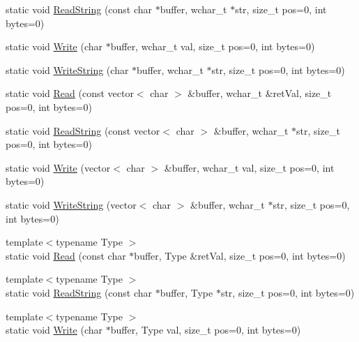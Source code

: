 \begin{DoxyCompactItemize}
\item 
static void \hyperlink{struct_y_compound_files_1_1_little_endian_a0d5fa769f24deb1c0d64b0d2166380b4}{Read\+String} (const char $\ast$buffer, wchar\+\_\+t $\ast$str, size\+\_\+t pos=0, int bytes=0)
\item 
static void \hyperlink{struct_y_compound_files_1_1_little_endian_a5ef0063196ca0fb704011bf7dda670cd}{Write} (char $\ast$buffer, wchar\+\_\+t val, size\+\_\+t pos=0, int bytes=0)
\item 
static void \hyperlink{struct_y_compound_files_1_1_little_endian_a8e1c4f95816e34b7b01acef853677354}{Write\+String} (char $\ast$buffer, wchar\+\_\+t $\ast$str, size\+\_\+t pos=0, int bytes=0)
\item 
static void \hyperlink{struct_y_compound_files_1_1_little_endian_a8a619b28efc8943270515b67c78c393d}{Read} (const vector$<$ char $>$ \&buffer, wchar\+\_\+t \&ret\+Val, size\+\_\+t pos=0, int bytes=0)
\item 
static void \hyperlink{struct_y_compound_files_1_1_little_endian_a7be32fbf63ebbf7eb40585c12e943571}{Read\+String} (const vector$<$ char $>$ \&buffer, wchar\+\_\+t $\ast$str, size\+\_\+t pos=0, int bytes=0)
\item 
static void \hyperlink{struct_y_compound_files_1_1_little_endian_af9c956dd7d659648601412f90eaa06a3}{Write} (vector$<$ char $>$ \&buffer, wchar\+\_\+t val, size\+\_\+t pos=0, int bytes=0)
\item 
static void \hyperlink{struct_y_compound_files_1_1_little_endian_a5d0a7504c887a43d1cf121b794e58645}{Write\+String} (vector$<$ char $>$ \&buffer, wchar\+\_\+t $\ast$str, size\+\_\+t pos=0, int bytes=0)
\item 
{\footnotesize template$<$typename Type $>$ }\\static void \hyperlink{struct_y_compound_files_1_1_little_endian_aa1abbafbc2ae88773a9de5fdedc2951d}{Read} (const char $\ast$buffer, Type \&ret\+Val, size\+\_\+t pos=0, int bytes=0)
\item 
{\footnotesize template$<$typename Type $>$ }\\static void \hyperlink{struct_y_compound_files_1_1_little_endian_a70f369d37063b9992e94775a44b1c6ec}{Read\+String} (const char $\ast$buffer, Type $\ast$str, size\+\_\+t pos=0, int bytes=0)
\item 
{\footnotesize template$<$typename Type $>$ }\\static void \hyperlink{struct_y_compound_files_1_1_little_endian_a26c8ed75679d9e99a3f35115d9eceba2}{Write} (char $\ast$buffer, Type val, size\+\_\+t pos=0, int bytes=0)

\end{DoxyCompactItemize}
